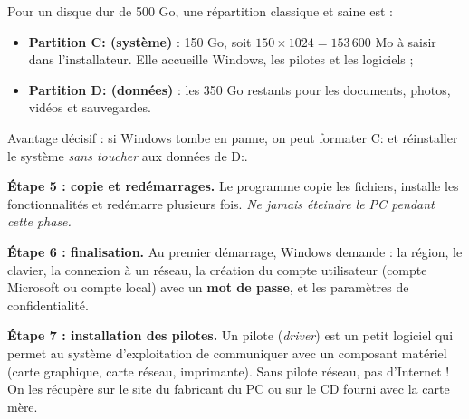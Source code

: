 \documentclass[11pt]{article}
\newcommand{\cle}[1]{{\popxbold\color{popdark}#1}}
\begin{document}
\begin{exemplebox}
Pour un disque dur de 500 Go, une répartition classique et saine est :
\begin{itemize}
\item \textbf{Partition C: (système)} : 150 Go, soit $150 \times 1024 = 153\,600$ Mo à saisir dans l'installateur. Elle accueille Windows, les pilotes et les logiciels ;
\item \textbf{Partition D: (données)} : les 350 Go restants pour les documents, photos, vidéos et sauvegardes.
\end{itemize}
Avantage décisif : si Windows tombe en panne, on peut formater C: et réinstaller le système \emph{sans toucher} aux données de D:.
\end{exemplebox}

\textbf{Étape 5 : copie et redémarrages.} Le programme copie les fichiers, installe les fonctionnalités et redémarre plusieurs fois. \emph{Ne jamais éteindre le PC pendant cette phase.}

\textbf{Étape 6 : finalisation.} Au premier démarrage, Windows demande : la région, le clavier, la connexion à un réseau, la création du \cle{compte utilisateur} (compte Microsoft ou compte local) avec un \textbf{mot de passe}, et les paramètres de confidentialité.

\textbf{Étape 7 : installation des pilotes.} Un \cle{pilote} (\emph{driver}) est un petit logiciel qui permet au système d'exploitation de communiquer avec un composant matériel (carte graphique, carte réseau, imprimante). Sans pilote réseau, pas d'Internet ! On les récupère sur le site du fabricant du PC ou sur le CD fourni avec la carte mère.
\end{document}
